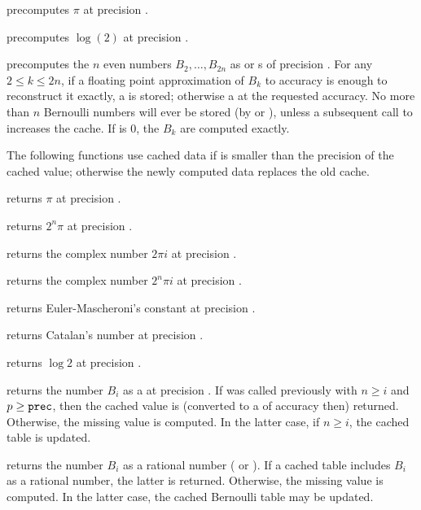  precomputes $\pi$ at precision .

 precomputes $\log(2)$ at precision
.

 precomputes the $n$ even
 numbers $B_2,\dots,B_{2n}$ as  or s of
precision . For any $2 \leq k \leq 2n$, if a floating point
approximation of $B_k$ to accuracy  is enough to reconstruct it
exactly, a  is stored; otherwise a  at the requested
accuracy. No more than $n$ Bernoulli numbers will ever be stored (by
 or ), unless a subsequent call to 
increases the cache. If  is $0$, the $B_k$ are computed exactly.

The following functions use cached data if  is smaller than the
precision of the cached value; otherwise the newly computed data replaces the
old cache.

 returns $\pi$ at precision .

 returns $2^n\pi$ at precision .

 returns the complex number $2\pi i$ at
precision .

 returns the complex number $2^n\pi i$ at
precision .

 returns Euler-Mascheroni's constant at
precision .

 returns Catalan's number at precision .

 returns $\log 2$ at precision .

 returns the  number
$B_i$ as a  at precision . If  was called previously with $n \geq i$ and $p \geq {\tt prec}$, then
the cached value is (converted to a  of accuracy  then)
returned. Otherwise, the missing value is computed. In the latter case,
if $n \geq i$, the cached table is updated.

 returns the  number $B_i$ as a
rational number ( or ). If a cached table includes $B_i$
as a rational number, the latter is returned. Otherwise, the missing value is
computed. In the latter case, the cached Bernoulli table may be updated.


